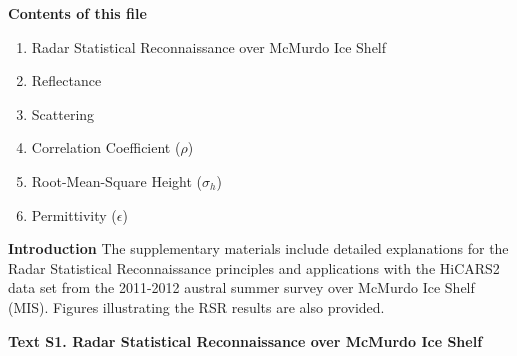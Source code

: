 \documentclass[agums,grl]{agutexSI}
\begin{document}
\begin{article}

%
%



\noindent\textbf{Contents of this file}
\begin{enumerate}
\item Radar Statistical Reconnaissance over McMurdo Ice Shelf
\item Reflectance
\item Scattering
\item Correlation Coefficient ($\rho$)
\item Root-Mean-Square Height ($\sigma_h$)
\item Permittivity ($\epsilon$)
\end{enumerate}

\vspace{5 mm}

\noindent\textbf{Introduction}
The supplementary materials include detailed explanations for the Radar Statistical Reconnaissance principles and applications with the HiCARS2 data set from the 2011-2012 austral summer survey over McMurdo Ice Shelf (MIS). Figures illustrating the RSR results are also provided.

\vspace{5 mm}

\noindent\textbf{Text S1. Radar Statistical Reconnaissance over McMurdo Ice Shelf}


\end{article}
\end{document}
